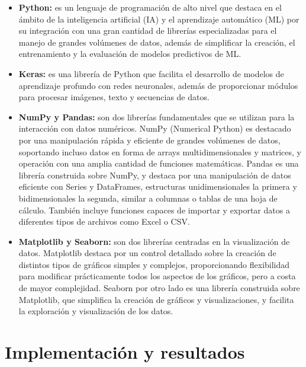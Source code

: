 \documentclass[12pt]{report} %
\begin{document}
\begin{itemize}

    \item \textbf{Python:} es un lenguaje de programación de alto nivel que destaca en el ámbito de la inteligencia artificial (IA) y el aprendizaje automático (ML) por su integración con una gran cantidad de librerías especializadas para el manejo de grandes volúmenes de datos, además de simplificar la creación, el entrenamiento y la evaluación de modelos predictivos de ML. \cite{python}
    \item \textbf{Keras:} es una librería de Python que facilita el desarrollo de modelos de aprendizaje profundo con redes neuronales, además de proporcionar módulos para procesar imágenes, texto y secuencias de datos. \cite{keras}
    \item \textbf{NumPy y Pandas:} son dos librerías fundamentales que se utilizan para la interacción con datos numéricos. NumPy (Numerical Python) es destacado por una manipulación rápida y eficiente de grandes volúmenes de datos, soportando incluso datos en forma de arrays multidimensionales y matrices, y operación con una amplia cantidad de funciones matemáticas. \cite{numpy} Pandas es una librería construida sobre NumPy, y destaca por una manipulación de datos eficiente con Series y DataFrames, estructuras unidimensionales la primera y bidimensionales la segunda, similar a columnas o tablas de una hoja de cálculo. También incluye funciones capaces de importar y exportar datos a diferentes tipos de archivos como Excel o CSV. \cite{pandas}
	\item \textbf{Matplotlib y Seaborn:} son dos librerías centradas en la visualización de datos. Matplotlib destaca por un control detallado sobre la creación de distintos tipos de gráficos simples y complejos, proporcionando flexibilidad para modificar prácticamente todos los aspectos de los gráficos, pero a costa de mayor complejidad. \cite{matplotlib} Seaborn por otro lado es una librería construida sobre Matplotlib, que simplifica la creación de gráficos y visualizaciones, y facilita la exploración y visualización de los datos. \cite{seaborn}

\end{itemize}



\chapter{Implementación y resultados}
\end{document}

